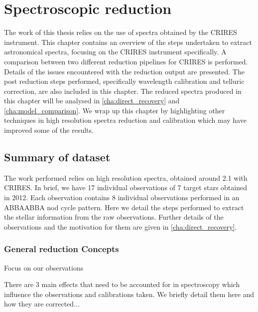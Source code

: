 
\chapter{Spectroscopic reduction} %
\label{cha:reduction}

The work of this thesis relies on the use of \nir{} spectra obtained by the {CRIRES} instrument.
This chapter contains an overview of the steps undertaken to extract astronomical spectra, focusing on the {CRIRES} instrument specifically.
A comparison between two different reduction pipelines for {CRIRES} is performed.
Details of the issues encountered with the reduction output are presented.
The post reduction steps performed, specifically wavelength calibration and telluric correction, are also included in this chapter.
The reduced spectra produced in this chapter will be analysed in \cref{cha:direct_recovery} and \cref{cha:model_comparison}.
We wrap up this chapter by highlighting other techniques in high resolution \nir{} spectra reduction and calibration which may have improved some of the results.

\section{Summary of dataset}
\todo{}{}
The work performed relies on high resolution \nir{} spectra, obtained around 2.1\um{} with {CRIRES}.
In brief, we have 17 individual observations of 7 target stars obtained in 2012.
Each observation contains 8 individual observations performed in an {ABBAABBA} nod cycle pattern.
Here we detail the steps performed to extract the stellar information from the raw observations.
Further details of the observations and the motivation for them are given in \cref{cha:direct_recovery}.


\subsection{General reduction Concepts}
\label{subsec:nirreduction}

Focus on our observations\todo{}

There are 3 main effects that need to be accounted for in \nir{} spectroscopy which influence the observations and calibrations taken.
We briefly detail them here and how they are corrected...

